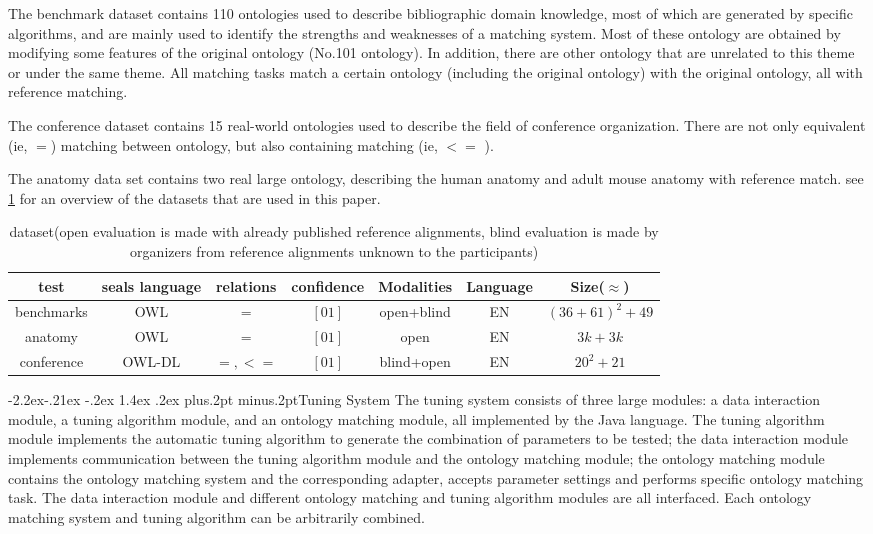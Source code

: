 \documentclass[twoside]{article}
\makeatletter
\def\subsubsection{\@startsection{subsubsection}{3}{\z@}%
 {-2.2ex\@plus -.21ex \@minus -.2ex}%
 {1.4ex \@plus.2ex}
{\normalfont\normalsize\protect\baselineskip=12pt plus.2pt minus.2pt\sl}}
\makeatother
\begin{document}
The benchmark dataset contains 110 ontologies used to describe bibliographic domain knowledge, most of which are generated by specific algorithms, and are mainly used to identify the strengths and weaknesses of a matching system. Most of these ontology are obtained by modifying some features of the original ontology (No.101 ontology). In addition, there are other ontology that are unrelated to this theme or under the same theme.
All matching tasks match a certain ontology (including the original ontology) with the original ontology, all with reference matching.

The conference dataset contains 15 real-world ontologies used to describe the field of conference organization. There are not only equivalent (ie, $=$) matching between ontology, but also containing matching (ie, $<=$ ).

The anatomy data set contains two real large ontology, describing the human anatomy and adult mouse anatomy with reference match.
see \ref{table:dataset} for an overview of the datasets that are used in this paper.

\begin{table}[ht]
\centering
\caption{dataset(open evaluation is made with already published reference alignments, blind evaluation is made by organizers from reference alignments unknown to the
participants)}
\label{table:dataset}
\begin{tabular}{@{}ccccccc@{}}
\toprule
test		& seals language	& relations	 	& confidence	& Modalities	& Language	& Size($\approx$)		\\ \midrule
benchmarks	& OWL				& $=$		 	& $[0 1]$		& open+blind	& EN		& $(36+61)^2+49$	\\
anatomy		& OWL				& $=$		 	& $[0 1]$		& open			& EN		& $3k+3k$			\\
conference	& OWL-DL			& $=,<=$	 	& $[0 1]$		& blind+open	& EN		& $20^2+21$		\\ \bottomrule
\end{tabular}
\end{table}


\subsubsection{Tuning System}
The tuning system consists of three large modules: a data interaction module, a tuning algorithm module, and an ontology matching module, all implemented by the Java language.
The tuning algorithm module implements the automatic tuning algorithm to generate the combination of parameters to be tested; the data interaction module implements communication between the tuning algorithm module and the ontology matching module; the ontology matching module contains the ontology matching system and the corresponding adapter, accepts parameter settings and performs specific ontology matching task.
The data interaction module and different ontology matching and tuning algorithm modules are all interfaced. Each ontology matching system and tuning algorithm can be arbitrarily combined.
\end{document}
